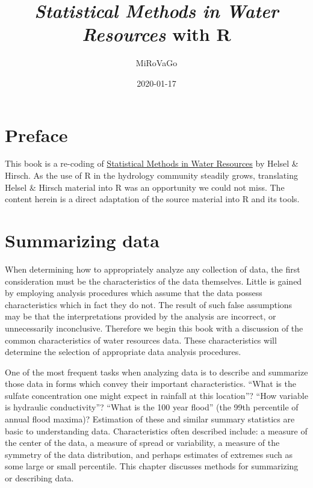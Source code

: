\documentclass[]{book}
\title{\emph{Statistical Methods in Water Resources} with R}
\author{MiRoVaGo}
\date{2020-01-17}
\begin{document}
\maketitle

{
\setcounter{tocdepth}{1}
\tableofcontents
}
\hypertarget{preface}{%
\chapter*{Preface}\label{preface}}

This book is a re-coding of \href{https://pubs.usgs.gov/twri/twri4a3/}{Statistical Methods in Water Resources} by Helsel \& Hirsch. As the use of R in the hydrology community steadily grows, translating Helsel \& Hirsch material into R was an opportunity we could not miss. The content herein is a direct adaptation of the source material into R and its tools.

\hypertarget{ch1}{%
\chapter{Summarizing data}\label{ch1}}

When determining how to appropriately analyze any collection of data, the first consideration must be the characteristics of the data themselves. Little is gained by employing analysis procedures which assume that the data possess characteristics which in fact they do not. The result of such false assumptions may be that the interpretations provided by the analysis are incorrect, or unnecessarily inconclusive. Therefore we begin this book with a discussion of the common characteristics of water resources data. These characteristics will determine the selection of appropriate data analysis procedures.

One of the most frequent tasks when analyzing data is to describe and summarize those data in forms which convey their important characteristics. ``What is the sulfate concentration one might expect in rainfall at this location''? ``How variable is hydraulic conductivity''? ``What is the 100 year flood'' (the 99th percentile of annual flood maxima)? Estimation of these and similar summary statistics are basic to understanding data. Characteristics often described include: a measure of the center of the data, a measure of spread or variability, a measure of the symmetry of the data distribution, and perhaps estimates of extremes such as some large or small percentile. This chapter discusses methods for summarizing or describing data.
\end{document}
